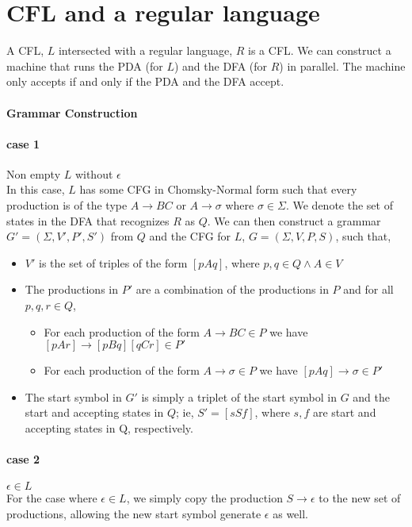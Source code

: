 \documentclass[11pt,letterpaper]{article}
\begin{document}
\section{CFL and a regular language}
A CFL, $L$ intersected with a regular language, $R$ is a CFL. We can construct a machine that runs the PDA (for $L$) and the DFA (for $R$) in parallel. The machine only accepts if and only if the PDA and the DFA accept.
\paragraph{Grammar Construction} 
\paragraph{case 1} Non empty $L$ without $\epsilon$ \\
In this case, $L$ has some CFG in Chomsky-Normal form such that every production is of the type $A \rightarrow BC$ or $A \rightarrow \sigma$ where $\sigma \in \Sigma$. We denote the set of states in the DFA that recognizes $R$ as $Q$. We can then construct a grammar $G' = (\Sigma,V',P',S')$ from $Q$ and the CFG for $L$, $G = (\Sigma,V,P,S)$, such that,
\begin{itemize}
    \item $V'$ is the set of triples of the form $[pAq]$, where $p,q \in Q \wedge A \in V$
    \item The productions in $P'$ are a combination of the productions in $P$ and for all $p,q,r \in Q$, 
    \begin{itemize}
        \item For each production of the form $A \rightarrow BC \in P$ we have $[pAr] \rightarrow [pBq][qCr] \in P'$
        \item For each production of the form $A \rightarrow \sigma \in P$ we have $[pAq] \rightarrow \sigma \in P'$
    \end{itemize}
    \item The start symbol in $G'$ is simply a triplet of the start symbol in $G$ and the start and accepting states in $Q$; ie, $S' = [sSf]$, where $s,f$ are start and accepting states in Q, respectively.
\end{itemize}
\paragraph{case 2} $\epsilon \in L$ \\
For the case where $\epsilon \in L$, we simply copy the production $S \rightarrow \epsilon$ to the new set of productions, allowing the new start symbol generate $\epsilon$ as well.
\end{document}
